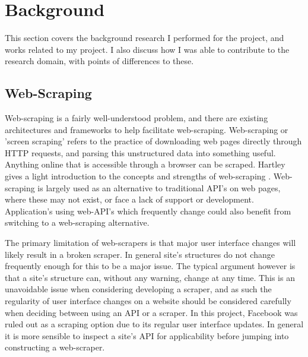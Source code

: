 \chapter{Background}\label{C:us}







This section covers the background research I performed for the project, and works related to my project. I also discuss how I was able to contribute to the research domain, with points of differences to these. 

\section{Web-Scraping}

Web-scraping is a fairly well-understood problem, and there are existing architectures and frameworks to help facilitate web-scraping.  Web-scraping or 'screen scraping' refers to the practice of downloading web pages directly through HTTP requests, and parsing this unstructured data into something useful. Anything online that is accessible through a browser can be scraped. Hartley gives a light introduction to the concepts and strengths of web-scraping \cite{no_api_for_me}. Web-scraping is largely used as an alternative to traditional API's on web pages, where these may not exist, or face a lack of support or development. Application's using web-API's which frequently change could also benefit from switching to a web-scraping alternative.

The primary limitation of web-scrapers is that major user interface changes will likely result in a broken scraper. In general site's structures do not change frequently enough for this to be a major issue. The typical argument however is that a site's structure can, without any warning, change at any time. This is an unavoidable issue when considering developing a scraper, and as such the regularity of user interface changes on a website should be considered carefully when deciding between using an API or a scraper. In this project, Facebook was ruled out as a scraping option due to its regular user interface updates. In general it is more sensible to inspect a site's API for applicability before jumping into constructing a web-scraper. 

